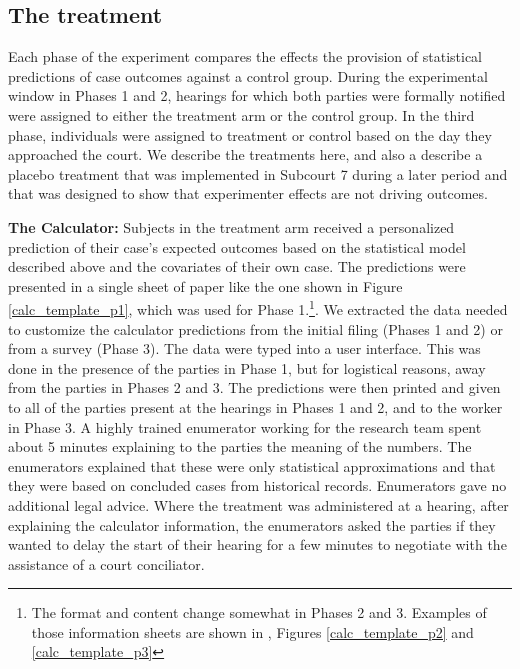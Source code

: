 \documentclass[11pt, a4paper]{article}
\begin{document}
\subsection{The treatment}
Each phase of the experiment compares the effects the provision of statistical predictions of case outcomes against a control group. During the experimental window in Phases 1 and 2, hearings for which both parties were formally notified were assigned to either the treatment arm or the control group. In the third phase, individuals were assigned to treatment or control based on the day they approached the court. We describe the treatments here, and also a describe a placebo treatment that was implemented in Subcourt 7 during a later period and that was designed to show that experimenter effects are not driving outcomes. 
   \vspace{5mm} 
   
\noindent\textbf{The Calculator:} Subjects in the treatment arm received a personalized prediction of their case's expected outcomes based on the statistical model described above and the covariates of their own case. The predictions were presented in a single sheet of paper like the one shown in Figure \ref{calc_template_p1}, which was used for Phase 1.\footnote{The format and content change somewhat in Phases 2 and 3. Examples of those information sheets are shown in , Figures \ref{calc_template_p2} and \ref{calc_template_p3}}. We extracted the data needed to customize the calculator predictions from the initial filing (Phases 1 and 2) or from a survey (Phase 3). The data were typed into a user interface. This was done in the presence of the parties in Phase 1, but for logistical reasons, away from the parties in Phases 2 and 3. The predictions were then printed and given to all of the parties present at the hearings in Phases 1 and 2, and to the worker in Phase 3. A highly trained enumerator working for the research team spent about 5 minutes explaining to the parties the meaning of the numbers. The enumerators explained that these were only statistical approximations and that they were based on concluded cases from historical records. Enumerators gave no additional legal advice. Where the treatment was administered at a hearing, after explaining the calculator information, the enumerators asked the parties if they wanted to delay the start of their hearing for a few minutes to negotiate with the assistance of a court conciliator. %
    
\end{document}
